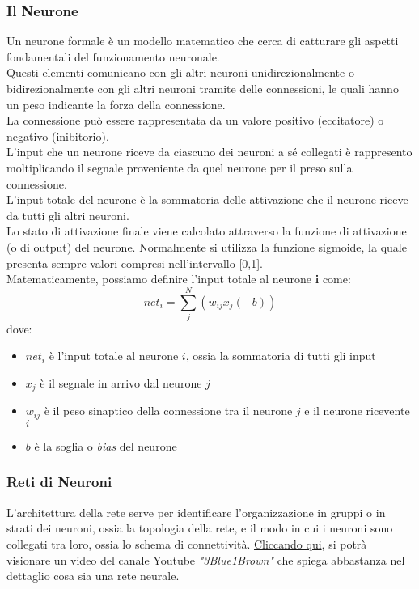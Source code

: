 \documentclass[12pt, a4paper]{article}
\begin{document}
\subsubsection{Il Neurone}
Un neurone formale è un modello matematico che cerca di catturare gli aspetti fondamentali del funzionamento neuronale.\\
Questi elementi comunicano con gli altri neuroni unidirezionalmente o bidirezionalmente con gli altri neuroni tramite delle connessioni, le quali hanno un peso indicante la forza della connessione.\\
La connessione può essere rappresentata da un valore positivo (eccitatore) o negativo (inibitorio).\\
L'input che un neurone riceve da ciascuno dei neuroni a sé collegati è rappresento moltiplicando il segnale proveniente da quel neurone per il preso sulla connessione.\\
L'input totale del neurone è la sommatoria delle attivazione che il neurone riceve da tutti gli altri neuroni.\\
Lo stato di attivazione finale viene calcolato attraverso la funzione di attivazione (o di output) del neurone. Normalmente si utilizza la funzione sigmoide, la quale presenta sempre valori compresi nell'intervallo [0,1].\\
Matematicamente, possiamo definire l'input totale al neurone \textbf{i} come:
\[net_i=\sum_j^N(w_{ij} x_j(-b))\]
dove:
\begin{itemize}
    \item \(net_i\) è l'input totale al neurone \(i\), ossia la sommatoria di tutti gli input
    \item \(x_j\) è il segnale in arrivo dal neurone \(j\)
    \item \(w_{ij}\) è il peso sinaptico della connessione tra il neurone \(j\) e il neurone ricevente \(i\)
    \item \(b\) è la soglia o \textit{bias} del neurone
\end{itemize}

\subsubsection{Reti di Neuroni}
L'architettura della rete serve per identificare l'organizzazione in gruppi o in strati dei neuroni, ossia la topologia della rete, e il modo in cui i neuroni sono collegati tra loro, ossia lo schema di connettività.
\href{https://www.youtube.com/watch?v=aircAruvnKk}{Cliccando qui}, si potrà visionare un video del canale Youtube \href{https://www.youtube.com/channel/UCYO_jab_esuFRV4b17AJtAw}{\textit{"3Blue1Brown"}} che spiega abbastanza nel dettaglio cosa sia una rete neurale.
\end{document}
